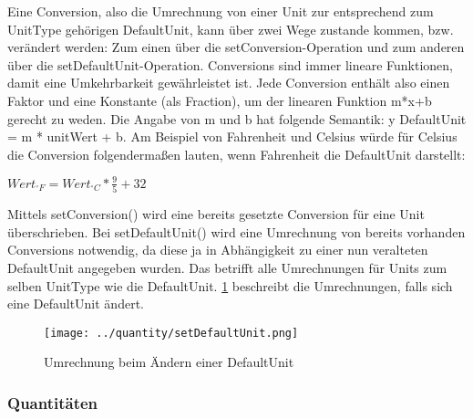  \newline
\label{ConversionsKapitel} 
Eine Conversion, also die Umrechnung von einer Unit zur entsprechend zum UnitType gehörigen DefaultUnit, kann über zwei Wege zustande kommen, bzw. verändert werden: Zum einen über die setConversion-Operation und zum anderen über die setDefaultUnit-Operation.
Conversions sind immer lineare Funktionen, damit eine Umkehrbarkeit gewährleistet ist. Jede Conversion enthält also einen Faktor und eine Konstante (als Fraction), um der linearen Funktion m*x+b gerecht zu weden. Die Angabe von m und b hat folgende Semantik: y DefaultUnit = m * unitWert + b.
Am Beispiel von Fahrenheit und Celsius würde für Celsius die Conversion folgendermaßen lauten, wenn Fahrenheit die DefaultUnit darstellt:

\( Wert_{^\circ F} = Wert_{^\circ C} * \frac{9}{5} + 32 \)

Mittels setConversion() wird eine bereits gesetzte Conversion für eine Unit überschrieben.
Bei setDefaultUnit() wird eine Umrechnung von bereits vorhanden Conversions notwendig, da diese ja in Abhängigkeit zu einer nun veralteten DefaultUnit angegeben wurden. Das betrifft alle Umrechnungen für Units zum selben UnitType wie die DefaultUnit.
\ref{setDefaultUnitGrafik} beschreibt die Umrechnungen, falls sich eine DefaultUnit ändert.
\begin{figure}[setDefaultUnit]
	\texttt{[image: ../quantity/setDefaultUnit.png]}
	\label{setDefaultUnitGrafik}
	\caption{Umrechnung beim Ändern einer DefaultUnit}
\end{figure}

\subsubsection{Quantitäten}